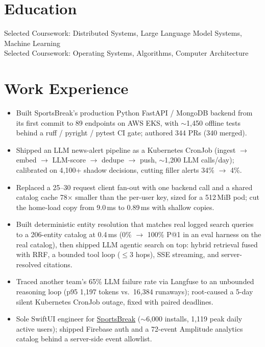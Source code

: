 \documentclass[11pt, letterpaper]{article}
\begin{document}

\section{Education}
Selected Coursework: Distributed Systems, Large Language Model Systems, Machine Learning\\[1pt]
Selected Coursework: Operating Systems, Algorithms, Computer Architecture

\section{Work Experience}
\begin{itemize}
  \item Built SportsBreak's production Python FastAPI / MongoDB backend from its first commit to 89 endpoints on AWS EKS, with $\sim$1{,}450 offline tests behind a ruff / pyright / pytest CI gate; authored 344 PRs (340 merged).
  \item Shipped an LLM news-alert pipeline as a Kubernetes CronJob (ingest $\to$ embed $\to$ LLM-score $\to$ dedupe $\to$ push, $\sim$1{,}200 LLM calls/day); calibrated on 4{,}100+ shadow decisions, cutting filler alerts 34\% $\to$ 4\%.
  \item Replaced a 25--30 request client fan-out with one backend call and a shared catalog cache 78$\times$ smaller than the per-user key, sized for a 512\,MiB pod; cut the home-load copy from 9.0\,ms to 0.89\,ms with shallow copies.
  \item Built deterministic entity resolution that matches real logged search queries to a 206-entity catalog at 0.4\,ms (0\% $\to$ 100\% P@1 in an eval harness on the real catalog), then shipped LLM agentic search on top: hybrid retrieval fused with RRF, a bounded tool loop ($\le$3 hops), SSE streaming, and server-resolved citations.
  \item Traced another team's 65\% LLM failure rate via Langfuse to an unbounded reasoning loop (p95 1{,}197 tokens vs.\ 16{,}384 runaways); root-caused a 5-day silent Kubernetes CronJob outage, fixed with paired deadlines.
  \item Sole SwiftUI engineer for \href{https://apps.apple.com/app/id6762649287}{SportsBreak} ($\sim$6{,}000 installs, 1{,}119 peak daily active users); shipped Firebase auth and a 72-event Amplitude analytics catalog behind a server-side event allowlist.
\end{itemize}
\end{document}
